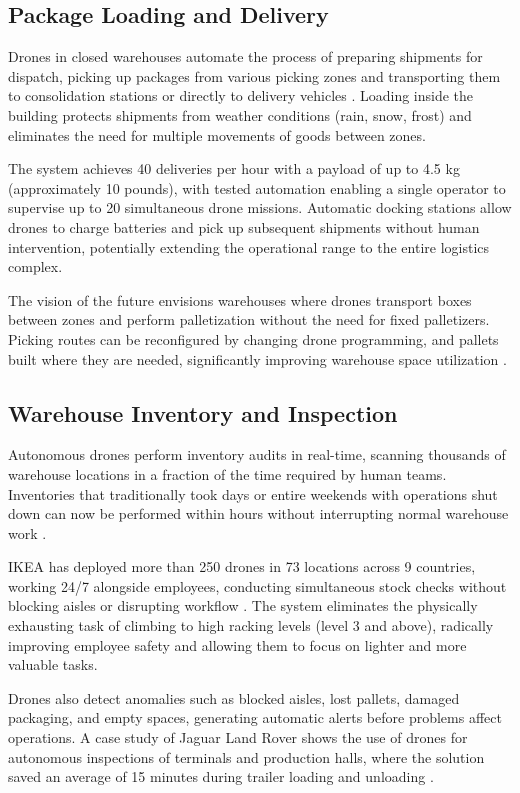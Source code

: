 \documentclass{EE-dyplom}
\begin{document}
\subsection{Package Loading and Delivery}

Drones in closed warehouses automate the process of preparing shipments for dispatch, picking up packages from various picking zones and transporting them to consolidation stations or directly to delivery vehicles \cite{cichosz2020}. Loading inside the building protects shipments from weather conditions (rain, snow, frost) and eliminates the need for multiple movements of goods between zones.

The system achieves 40 deliveries per hour with a payload of up to 4.5 kg (approximately 10 pounds), with tested automation enabling a single operator to supervise up to 20 simultaneous drone missions. Automatic docking stations allow drones to charge batteries and pick up subsequent shipments without human intervention, potentially extending the operational range to the entire logistics complex.

The vision of the future envisions warehouses where drones transport boxes between zones and perform palletization without the need for fixed palletizers. Picking routes can be reconfigured by changing drone programming, and pallets built where they are needed, significantly improving warehouse space utilization \cite{logisticsbureau2024}.

\subsection{Warehouse Inventory and Inspection}

Autonomous drones perform inventory audits in real-time, scanning thousands of warehouse locations in a fraction of the time required by human teams. Inventories that traditionally took days or entire weekends with operations shut down can now be performed within hours without interrupting normal warehouse work \cite{aeologic2025}.

IKEA has deployed more than 250 drones in 73 locations across 9 countries, working 24/7 alongside employees, conducting simultaneous stock checks without blocking aisles or disrupting workflow \cite{talkinglogistics2024}. The system eliminates the physically exhausting task of climbing to high racking levels (level 3 and above), radically improving employee safety and allowing them to focus on lighter and more valuable tasks.

Drones also detect anomalies such as blocked aisles, lost pallets, damaged packaging, and empty spaces, generating automatic alerts before problems affect operations. A case study of Jaguar Land Rover shows the use of drones for autonomous inspections of terminals and production halls, where the solution saved an average of 15 minutes during trailer loading and unloading \cite{autologistics2025}.
\end{document}

